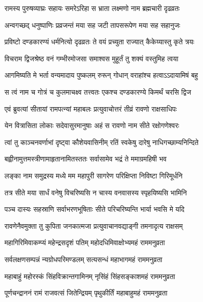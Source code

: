 \twolineshloka
{रामस्य पुरुषव्याघ्रः सहायः समरेऽरिहा}
{स भ्राता लक्ष्मणो नाम ब्रह्मचारी दृढव्रतः} %

\twolineshloka
{अन्वगच्छद् धनुष्पाणिः प्रव्रजन्तं मया सह}
{जटी तापसरूपेण मया सह सहानुजः} %

\twolineshloka
{प्रविष्टो दण्डकारण्यं धर्मनित्यो दृढव्रतः}
{ते वयं प्रच्युता राज्यात् कैकेय्यास्तु कृते त्रयः} %

\twolineshloka
{विचराम द्विजश्रेष्ठ वनं गम्भीरमोजसा}
{समाश्वस मुहूर्तं तु शक्यं वस्तुमिह त्वया} %

\twolineshloka
{आगमिष्यति मे भर्ता वन्यमादाय पुष्कलम्}
{रुरून् गोधान् वराहांश्च हत्वाऽऽदायामिषं बहु} %

\twolineshloka
{स त्वं नाम च गोत्रं च कुलमाचक्ष्व तत्त्वतः}
{एकश्च दण्डकारण्ये किमर्थं चरसि द्विज} %

\twolineshloka
{एवं ब्रुवत्यां सीतायां रामपत्न्यां महाबलः}
{प्रत्युवाचोत्तरं तीव्रं रावणो राक्षसाधिपः} %

\twolineshloka
{येन वित्रासिता लोकाः सदेवासुरमानुषाः}
{अहं स रावणो नाम सीते रक्षोगणेश्वरः} %

\twolineshloka
{त्वां तु काञ्चनवर्णाभां दृष्ट्वा कौशेयवासिनीम्}
{रतिं स्वकेषु दारेषु नाधिगच्छाम्यनिन्दिते} %

\twolineshloka
{बह्वीनामुत्तमस्त्रीणामाहृतानामितस्ततः}
{सर्वासामेव भद्रं ते ममाग्रमहिषी भव} %

\twolineshloka
{लङ्का नाम समुद्रस्य मध्ये मम महापुरी}
{सागरेण परिक्षिप्ता निविष्टा गिरिमूर्धनि} %

\twolineshloka
{तत्र सीते मया सार्धं वनेषु विचरिष्यसि}
{न चास्य वनवासस्य स्पृहयिष्यसि भामिनि} %

\twolineshloka
{पञ्च दास्यः सहस्राणि सर्वाभरणभूषिताः}
{सीते परिचरिष्यन्ति भार्या भवसि मे यदि} %

\twolineshloka
{रावणेनैवमुक्ता तु कुपिता जनकात्मजा}
{प्रत्युवाचानवद्याङ्गी तमनादृत्य राक्षसम्} %

\twolineshloka
{महागिरिमिवाकम्प्यं महेन्द्रसदृशं पतिम्}
{महोदधिमिवाक्षोभ्यमहं राममनुव्रता} %

\twolineshloka
{सर्वलक्षणसम्पन्नं न्यग्रोधपरिमण्डलम्}
{सत्यसन्धं महाभागमहं राममनुव्रता} %

\twolineshloka
{महाबाहुं महोरस्कं सिंहविक्रान्तगामिनम्}
{नृसिंहं सिंहसङ्काशमहं राममनुव्रता} %

\twolineshloka
{पूर्णचन्द्राननं रामं राजवत्सं जितेन्द्रियम्}
{पृथुकीर्तिं महाबाहुमहं राममनुव्रता} %

